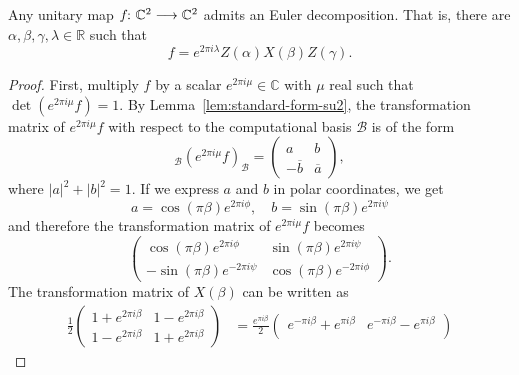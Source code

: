 \documentclass[a4paper, oneside, 12pt]{amsart}
\begin{document}
\begin{proposition}\label{prop:euler-decomposition-of-rotation}
  Any unitary map \( f \from \mathbb{C}^2 \to \mathbb{C}^2 \) admits an Euler decomposition.
  That is, there are \( \alpha, \beta, \gamma, \lambda \in \mathbb{R} \) such that
  \begin{equation}\label{eq:euler-decomposition-of-rotation}
    f = e^{2 \pi i \lambda} Z(\alpha) X(\beta) Z(\gamma).
  \end{equation}
\end{proposition}
\begin{proof}
  First, multiply \( f \) by a scalar \( e^{2\pi i \mu} \in \mathbb{C} \) with \( \mu \) real such that \( \det(e^{2\pi i \mu} f) = 1 \).
  By Lemma~\ref{lem:standard-form-su2}, the transformation matrix of \( e^{2\pi i \mu} f \) with respect to the computational basis \( \mathcal{B} \) is of the form
  \begin{equation*}
    {}_{\mathcal{B}}(e^{2\pi i \mu} f)_{\mathcal{B}} =
    \begin{pmatrix}
      a & b \\
      -\overline{b} & \overline{a}
    \end{pmatrix},
  \end{equation*}
  where \( |a|^2 + |b|^2 = 1 \).
  If we express \( a \) and \( b \) in polar coordinates, we get
  \begin{equation*}
    a = \cos(\pi \beta) e^{2\pi i \phi}, \quad b = \sin(\pi \beta) e^{2\pi i \psi}
  \end{equation*}
  and therefore the transformation matrix of \(e^{2\pi i \mu} f\) becomes
  \begin{equation*}
    \begin{pmatrix}
      \cos(\pi \beta) e^{2\pi i \phi} & \sin(\pi \beta) e^{2\pi i \psi} \\
      -\sin(\pi \beta) e^{-2\pi i \psi} & \cos(\pi \beta) e^{-2\pi i \phi}
    \end{pmatrix}.
  \end{equation*}
  The transformation matrix of \(X(\beta)\) can be written as
  \begin{align*}
    \frac{1}{2}
    \begin{pmatrix}
      1+ e^{2\pi i \beta}  & 1 - e^{2\pi i \beta} \\
      1 - e^{2\pi i \beta} & 1 +  e^{2\pi i \beta}
    \end{pmatrix}
    & =
    \frac{e^{\pi i \beta}}{2}
    \begin{pmatrix}
      e^{-\pi i \beta} + e^{\pi i \beta} & e^{- \pi i \beta} - e^{\pi i \beta} \\

\end{pmatrix}
\end{align*}
\end{proof}
\end{document}

